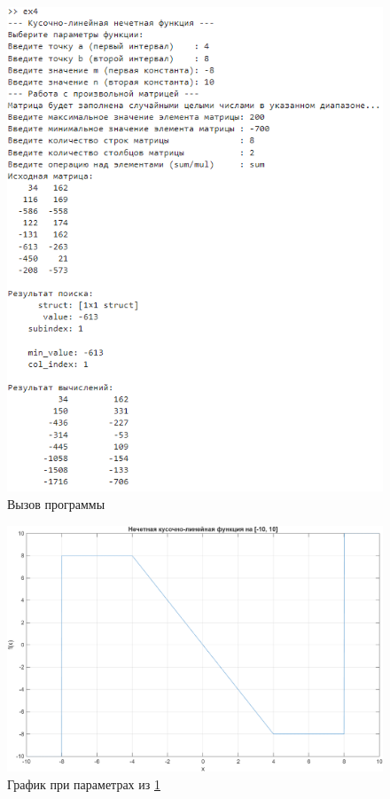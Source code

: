 \begin{figure}[hbt]
    \centering
    \includegraphics[width=\linewidth, height=0.75\textheight, keepaspectratio]{figs/result.png}
    \caption{Вызов программы}
    \label{fig:result.png}
\end{figure}

\begin{figure}[hbt]
    \centering
    \includegraphics[width=1.00\textwidth]{figs/result_figure.png}
    \caption{График при параметрах из \cref{fig:result.png}}
    \label{fig:result_figure.png}
\end{figure}

